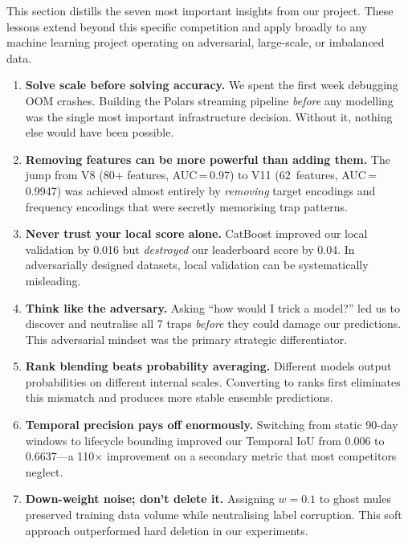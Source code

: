 \documentclass[11pt, a4paper]{article}
\begin{document}
This section distills the seven most important insights from our project. These lessons
extend beyond this specific competition and apply broadly to any machine learning project
operating on adversarial, large-scale, or imbalanced data.

\begin{enumerate}[leftmargin=1.5em, itemsep=8pt]
    \item \textbf{Solve scale before solving accuracy.}\quad
          We spent the first week debugging OOM crashes. Building the Polars streaming
          pipeline \emph{before} any modelling was the single most important infrastructure
          decision. Without it, nothing else would have been possible.

    \item \textbf{Removing features can be more powerful than adding them.}\quad
          The jump from V8 (80+ features, AUC\,=\,0.97) to V11 (62~features,
          AUC\,=\,0.9947) was achieved almost entirely by \emph{removing} target encodings
          and frequency encodings that were secretly memorising trap patterns.

    \item \textbf{Never trust your local score alone.}\quad
          CatBoost improved our local validation by 0.016 but \emph{destroyed} our
          leaderboard score by 0.04. In adversarially designed datasets, local validation
          can be systematically misleading.

    \item \textbf{Think like the adversary.}\quad
          Asking ``how would I trick a model?'' led us to discover and neutralise all 7
          traps \emph{before} they could damage our predictions. This adversarial mindset
          was the primary strategic differentiator.

    \item \textbf{Rank blending beats probability averaging.}\quad
          Different models output probabilities on different internal scales. Converting to
          ranks first eliminates this mismatch and produces more stable ensemble predictions.

    \item \textbf{Temporal precision pays off enormously.}\quad
          Switching from static 90-day windows to lifecycle bounding improved our Temporal
          IoU from 0.006 to 0.6637---a 110$\times$ improvement on a secondary metric that
          most competitors neglect.

    \item \textbf{Down-weight noise; don't delete it.}\quad
          Assigning $w = 0.1$ to ghost mules preserved training data volume while
          neutralising label corruption. This soft approach outperformed hard deletion
          in our experiments.
\end{enumerate}
\end{document}
